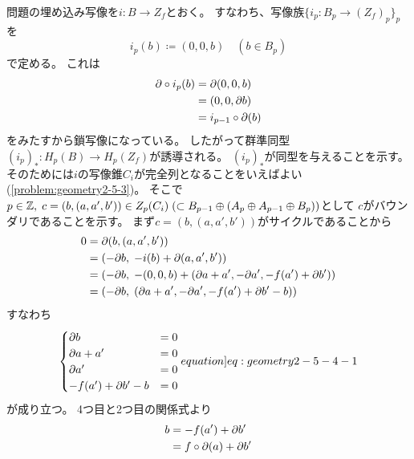\documentclass[report]{jlreq}
\begin{document}
\begin{answer}[解法 2.]
    問題の埋め込み写像を$i \colon B \to Z_f$とおく。
    すなわち、写像族$\{ i_p \colon B_p \to (Z_f)_p \}_p$を
    \begin{equation}
        i_p(b) \coloneqq (0, 0, b)
            \quad (b \in B_p)
    \end{equation}
    で定める。
    これは
    \begin{alignat}{1}
        \partial \circ i_p (b)
            &= \partial (0, 0, b) \\
            &= (0, 0, \partial b) \\
            &= i_{p - 1} \circ \partial (b)
    \end{alignat}
    をみたすから鎖写像になっている。
    したがって群準同型
    $(i_p)_* \colon H_p(B) \to H_p(Z_f)$が誘導される。
    $(i_p)_*$が同型を与えることを示す。
    そのためには$i$の写像錐$C_i$が完全列となることをいえばよい
    (\cref{problem:geometry2-5-3})。
    そこで$p \in \mathbb{Z}, \; c = (b, (a, a', b')) \in Z_p(C_i) \;
    (\subset B_{p - 1} \oplus (A_p \oplus A_{p - 1} \oplus B_p))$として
    $c$がバウンダリであることを示す。
    まず$c = (b, (a, a', b'))$がサイクルであることから
    \begin{alignat}{1}
        0
            &= \partial (b, (a, a', b')) \\
            &= (- \partial b, \; - i(b) + \partial (a, a', b')) \\
            &= (
                - \partial b, \;
                - (0, 0, b) + (\partial a + a', - \partial a', - f(a') + \partial b')
            ) \\
            &= (
                - \partial b, \;
                (\partial a + a', - \partial a', - f(a') + \partial b' - b)
            )
    \end{alignat}
    すなわち
    \begin{equation}
        \begin{cases}
            \del b &= 0 \\
            \del a + a' &= 0 \\
            \del a' &= 0 \\
            - f(a') + \del b' - b &= 0
        \end{cases}
        \label[equation]{eq:geometry2-5-4-1}
    \end{equation}
    が成り立つ。
    4つ目と2つ目の関係式より
    \begin{alignat}{1}
        b
            &= - f(a') + \del b' \\
            &= f \circ \del (a) + \del b' \\

\end{alignat}
\end{answer}
\end{document}
